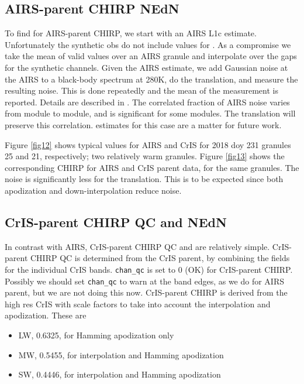 \documentclass[11pt]{article}
\begin{document}
\subsection{AIRS-parent CHIRP NEdN}

To find {\nedn} for AIRS-parent CHIRP, we start with an AIRS L1c
{\nedn} estimate.  Unfortunately the synthetic obs do not include
values for {\nedn}.  As a compromise we take the mean of valid
{\nedn} values over an AIRS granule and interpolate over the gaps
for the synthetic channels.  Given the AIRS estimate, we add
Gaussian noise at the AIRS {\nedn} to a black-body spectrum at 280K,
do the translation, and measure the resulting noise.  This is done
repeatedly and the mean of the measurement is reported.  Details are
described in \cite{mott2018}.  The correlated fraction of AIRS noise
varies from module to module, and is significant for some modules.
The translation will preserve this correlation.  {\nedn} estimates
for this case are a matter for future work.

Figure \ref{fig12} shows typical values for AIRS and CrIS {\nedn}
for 2018 doy 231 granules 25 and 21, respectively; two relatively
warm granules.  Figure \ref{fig13} shows the corresponding CHIRP
{\nedn} for AIRS and CrIS parent data, for the same granules.
The noise is significantly less for the translation.  This is to be
expected since both apodization and down-interpolation reduce noise.

\subsection{CrIS-parent CHIRP QC and NEdN}

In contrast with AIRS, CrIS-parent CHIRP QC and {\nedn} are
relatively simple.  CrIS-parent CHIRP QC is determined from the CrIS
parent, by combining the fields for the individual CrIS bands.
\texttt{chan\_qc} is set to 0 (OK) for CrIS-parent CHIRP.  Possibly
we should set \texttt{chan\_qc} to warn at the band edges, as we do
for AIRS parent, but we are not doing this now.  CrIS-parent CHIRP
{\nedn} is derived from the high res CrIS {\nedn} with scale factors
to take into account the interpolation and apodization.  These are
\begin{itemize}
   \item LW, 0.6325, for Hamming apodization only
   \item MW, 0.5455, for interpolation and Hamming apodization
   \item SW, 0.4446, for interpolation and Hamming apodization
\end{itemize}
\end{document}
